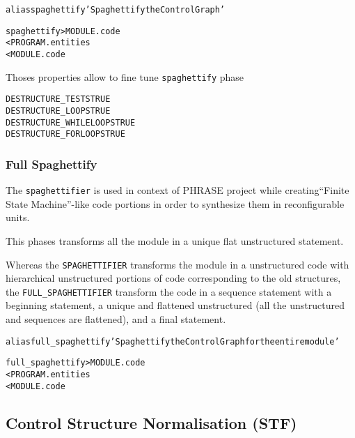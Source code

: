 \documentclass[a4paper]{report}
\newenvironment{PipsProp}{\begin{alltt}}{\end{alltt}}
\newenvironment{PipsMake}{\begin{alltt}}{\end{alltt}}
\begin{document}
\begin{PipsMake}
alias spaghettify 'Spaghettify the Control Graph'
\end{PipsMake}

\begin{PipsMake}
spaghettify          > MODULE.code
        < PROGRAM.entities
        < MODULE.code
\end{PipsMake}


Thoses properties allow to fine tune \verb|spaghettify| phase

\begin{PipsProp}
DESTRUCTURE_TESTS TRUE
DESTRUCTURE_LOOPS TRUE
DESTRUCTURE_WHILELOOPS TRUE
DESTRUCTURE_FORLOOPS TRUE
\end{PipsProp}



\subsubsection{Full Spaghettify}
\label{paragraph-full-spaghettify}

The \texttt{spaghettifier} is used in context of PHRASE project while
creating``Finite State Machine''-like code portions in order to synthesize
them in reconfigurable units.

This phases transforms all the module in a unique flat unstructured
statement.

Whereas the \texttt{SPAGHETTIFIER} transforms the module in a unstructured
code with hierarchical unstructured portions of code corresponding to the
old structures, the \texttt{FULL\_SPAGHETTIFIER} transform the code in a
sequence statement with a beginning statement, a unique and flattened
unstructured (all the unstructured and sequences are flattened), and a
final statement.

\begin{PipsMake}
alias full_spaghettify 'Spaghettify the Control Graph for the entire module'
\end{PipsMake}

\begin{PipsMake}
full_spaghettify          > MODULE.code
        < PROGRAM.entities
        < MODULE.code
\end{PipsMake}


\subsection{Control Structure Normalisation (STF)}
\label{subsection-control-structure-normalization-stf}
\end{document}
